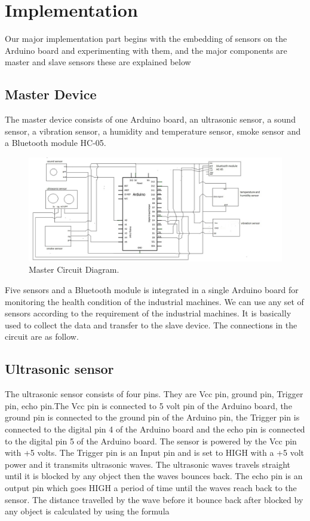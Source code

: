 \section{Implementation}
Our major implementation part begins with the embedding of sensors on the Arduino board and experimenting with them, and the major components are master and slave sensors these are explained below
\subsection{Master Device}
The master device consists of one Arduino board, an ultrasonic sensor, a sound sensor, a
vibration sensor, a humidity and temperature sensor, smoke sensor and a Bluetooth module
HC-05.
\begin{figure}[h]
\centerline{\includegraphics[width=5.7in]{MC}}
\caption{ Master Circuit Diagram.}
\end{figure}
Five sensors and a Bluetooth module is integrated in a single Arduino board for monitoring the health condition of the industrial machines. We can use any set of sensors according to the requirement of the industrial machines. It is basically used to collect the data and transfer to the slave device. The connections in the circuit are as follow.
\subsection{Ultrasonic sensor}
The ultrasonic sensor consists of four pins. They are Vcc pin, ground pin, Trigger pin, echo pin.The Vcc pin is connected to 5 volt pin of the Arduino board, the ground pin is connected to the ground pin of the Arduino pin, the Trigger pin is connected to the digital pin 4 of the Arduino
board and the echo pin is connected to the digital pin 5 of the Arduino board. The sensor is powered by the Vcc pin with +5 volts. The Trigger pin is an Input pin and is set to HIGH with a +5 volt power and it transmits ultrasonic waves. The ultrasonic waves travels straight until it is
blocked by any object then the waves bounces back. The echo pin is an output pin which goes HIGH a period of time until the waves reach back to the sensor. The distance travelled by the wave before it bounce back after blocked by any object is calculated by using the formula

